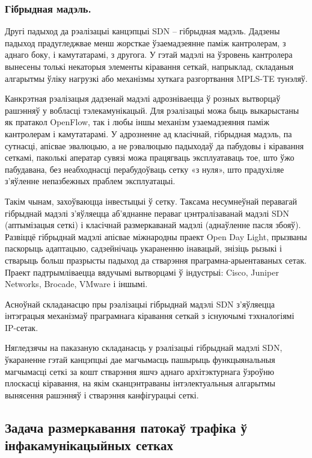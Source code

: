 \subsubsection{Гібрыдная мадэль.}
Другі падыход да рэалізацыі канцэпцыі SDN --
гібрыдная мадэль.
Дадзены падыход прадугледжвае менш жорсткае ўзаемадзеянне паміж
кантролерам, з аднаго боку, і камутатарамі, з другога.
У гэтай мадэлі на ўзровень кантролера вынесены толькі некаторыя элементы кіравання сеткай, напрыклад, складаныя
алгарытмы ўліку нагрузкі або механізмы хуткага разгортвання MPLS-TE тунэляў.

Канкрэтная рэалізацыя дадзенай мадэлі адрозніваецца ў розных вытворцаў рашэнняў у вобласці тэлекамунікацый. Для рэалізацыі можа быць выкарыстаны як пратакол OpenFlow,
так і любы іншы механізм узаемадзеяння паміж кантролерам і камутатарамі.
У адрозненне ад класічнай, гібрыдная мадэль, па сутнасці, апісвае эвалюцыю, а не рэвалюцыю падыходаў да пабудовы і кіравання сеткамі, паколькі аператар сувязі можа
працягваць эксплуатаваць тое, што ўжо пабудавана, без неабходнасці перабудоўваць
сетку «з нуля», што прадухіляе з'яўленне непазбежных праблем эксплуатацыі.

Такім чынам, захоўваюцца інвестыцыі ў сетку. Таксама несумнеўнай перавагай гібрыднай
мадэлі з'яўляецца аб'яднанне пераваг цэнтралізаванай мадэлі SDN (аптымізацыя
сеткі) і класічнай размеркаванай мадэлі (аднаўленне пасля збояў).
Развіццё гібрыднай мадэлі апісвае міжнародны праект Open Day Light, прызваны паскорыць адаптацыю, садзейнічаць укараненню інавацый, знізіць рызыкі і стварыць больш празрысты падыход да стварэння праграмна-арыентаваных сетак.
Праект падтрымліваецца вядучымі вытворцамі ў індустрыі: Cisco, Juniper Networks, Brocade, VMware і іншымі.

Асноўнай складанасцю пры рэалізацыі гібрыднай мадэлі SDN з'яўляецца інтэграцыя механізмаў праграмнага кіравання сеткай з існуючымі тэхналогіямі IP-сетак.

Нягледзячы на паказаную складанасць у рэалізацыі гібрыднай мадэлі SDN, ўкараненне
гэтай канцэпцыі дае магчымасць пашырыць функцыянальныя магчымасці сеткі за кошт
стварэння яшчэ аднаго архітэктурнага ўзроўню плоскасці кіравання, на якім
сканцэнтраваны інтэлектуальныя алгарытмы вынясення рашэнняў і стварэння канфігурацыі сеткі.

\subsection{Задача размеркавання патокаў трафіка ў інфакамунікацыйных сетках}

